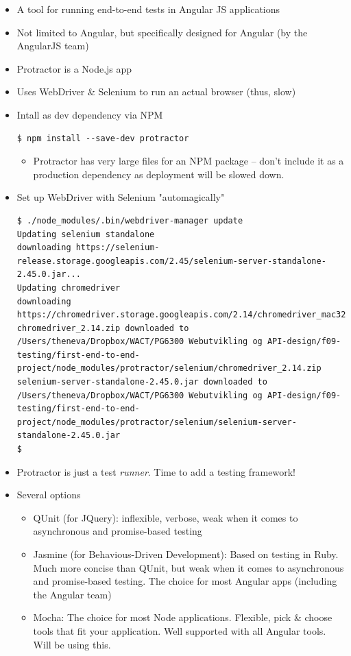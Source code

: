 \documentclass[british]{article}
\begin{document}
\begin{itemize}
  \item A tool for running end-to-end tests in Angular JS applications
  \item Not limited to Angular, but specifically designed for Angular (by the AngularJS team)
  \item Protractor is a Node.js app
  \item Uses WebDriver \& Selenium to run an actual browser (thus, slow)
  \item Intall as dev dependency via NPM
    \begin{lstlisting}
$ npm install --save-dev protractor        
    \end{lstlisting}
  \begin{itemize}
      \item Protractor has very large files for an NPM package -- don't include it as a production dependency as deployment will be slowed down.
  \end{itemize}
  \item Set up WebDriver with Selenium "automagically"
    \begin{lstlisting}
$ ./node_modules/.bin/webdriver-manager update
Updating selenium standalone
downloading https://selenium-release.storage.googleapis.com/2.45/selenium-server-standalone-2.45.0.jar...
Updating chromedriver
downloading https://chromedriver.storage.googleapis.com/2.14/chromedriver_mac32.zip...
chromedriver_2.14.zip downloaded to /Users/theneva/Dropbox/WACT/PG6300 Webutvikling og API-design/f09-testing/first-end-to-end-project/node_modules/protractor/selenium/chromedriver_2.14.zip
selenium-server-standalone-2.45.0.jar downloaded to /Users/theneva/Dropbox/WACT/PG6300 Webutvikling og API-design/f09-testing/first-end-to-end-project/node_modules/protractor/selenium/selenium-server-standalone-2.45.0.jar
$ 
    \end{lstlisting}
  \item Protractor is just a test \textit{runner}. Time to add a testing framework!
  \item Several options
  \begin{itemize}
    \item QUnit (for JQuery): inflexible, verbose, weak when it comes to asynchronous and promise-based testing
    \item Jasmine (for Behavious-Driven Development): Based on testing in Ruby. Much more concise than QUnit, but weak when it comes to asynchronous and promise-based testing. The choice for most Angular apps (including the Angular team)
    \item Mocha: The choice for most Node applications. Flexible, pick \& choose tools that fit your application. Well supported with all Angular tools. Will be using this.
  \end{itemize}
\end{itemize}
\end{document}
